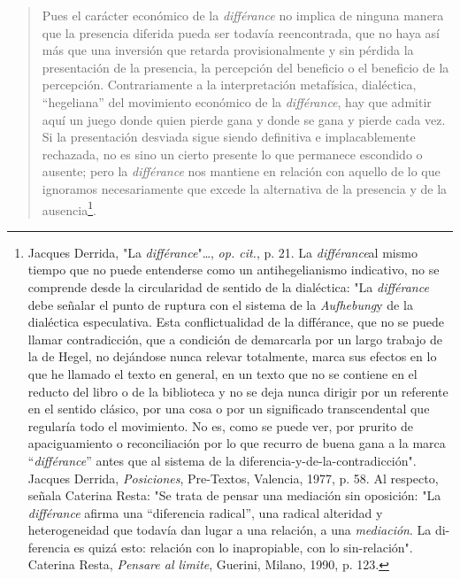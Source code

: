 \documentclass{book}
\begin{document}
\begin{quote}
Pues el carácter económico de la \emph{différance} no implica de ninguna
manera que la presencia diferida pueda ser todavía reencontrada, que no
haya así más que una inversión que retarda provisionalmente y sin
pérdida la presentación de la presencia, la percepción del beneficio o
el beneficio de la percepción. Contrariamente a la interpretación
metafísica, dialéctica, ``hegeliana'' del movimiento económico de la
\emph{différance}, hay que admitir aquí un juego donde quien pierde gana
y donde se gana y pierde cada vez. Si la presentación desviada sigue
siendo definitiva e implacablemente rechazada, no es sino un cierto
presente lo que permanece escondido o ausente; pero la \emph{différance}
nos mantiene en relación con aquello de lo que ignoramos necesariamente
que excede la alternativa de la presencia y de la ausencia\footnote{Jacques
  Derrida, "La \emph{différance}"\ldots, \emph{op. cit.}, p. 21. La
  \emph{différance}al mismo tiempo que no puede entenderse como un
  antihegelianismo indicativo, no se comprende desde la circularidad de
  sentido de la dialéctica: "La \emph{différance} debe señalar el punto
  de ruptura con el sistema de la \emph{Aufhebung}y de la dialéctica
  especulativa. Esta conflictualidad de la différance, que no se puede
  llamar contradicción, que a condición de demarcarla por un largo
  trabajo de la de Hegel, no dejándose nunca relevar totalmente, marca
  sus efectos en lo que he llamado el texto en general, en un texto que
  no se contiene en el reducto del libro o de la biblioteca y no se deja
  nunca dirigir por un referente en el sentido clásico, por una cosa o
  por un significado transcendental que regularía todo el movimiento. No
  es, como se puede ver, por prurito de apaciguamiento o reconciliación
  por lo que recurro de buena gana a la marca ``\emph{différance}''
  antes que al sistema de la diferencia-y-de-la-contradicción". Jacques
  Derrida, \emph{Posiciones}, Pre-Textos, Valencia, 1977, p. 58. Al
  respecto, señala Caterina Resta: "Se trata de pensar una mediación sin
  oposición: "La \emph{différance} afirma una ``diferencia radical'',
  una radical alteridad y heterogeneidad que todavía dan lugar a una
  relación, a una \emph{mediación}. La di-ferencia es quizá esto:
  relación con lo inapropiable, con lo sin-relación". Caterina Resta,
  \emph{Pensare al limite}, Guerini, Milano, 1990, p. 123.}.
\end{quote}
\end{document}

